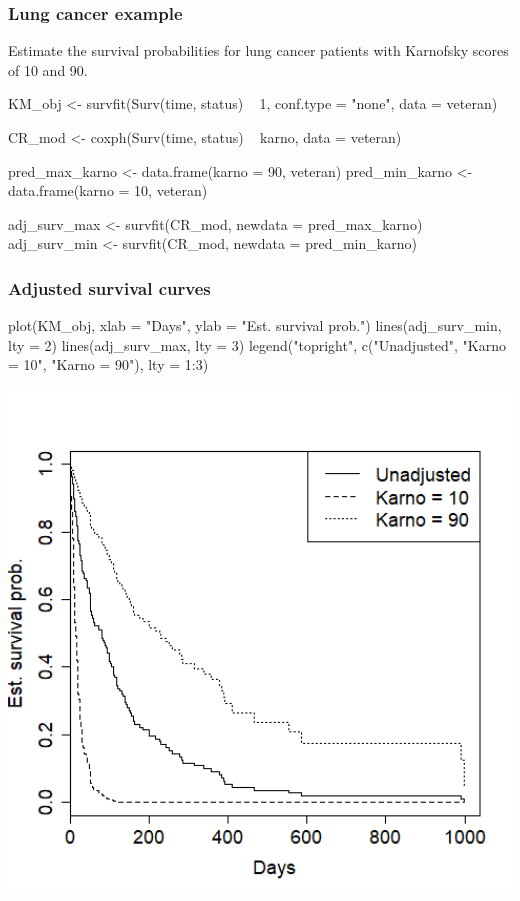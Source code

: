 \begin{frame}[fragile]
\frametitle{Lung cancer example}
Estimate the survival probabilities for lung cancer patients with Karnofsky scores of 10 and 90.
\begin{Rcode}{0.0}
KM_obj <- survfit(Surv(time, status) ~ 1,
                  conf.type = "none",
                  data = veteran)

CR_mod <- coxph(Surv(time, status) ~ karno, data = veteran)

pred_max_karno <- data.frame(karno = 90, veteran)
pred_min_karno <- data.frame(karno = 10, veteran)

adj_surv_max <- survfit(CR_mod, newdata = pred_max_karno)
adj_surv_min <- survfit(CR_mod, newdata = pred_min_karno)
\end{Rcode}
\end{frame}


\begin{frame}[fragile]
\frametitle{Adjusted survival curves}
\hspace*{-0.3in}
\begin{minipage}{0.58\textwidth}
\begin{Rcode}{0.0}
plot(KM_obj,
     xlab = "Days",
     ylab = "Est. survival prob.")
lines(adj_surv_min, lty = 2)
lines(adj_surv_max, lty = 3)
legend("topright",
       c("Unadjusted",
         "Karno = 10",
         "Karno = 90"),
       lty = 1:3)
\end{Rcode}
\end{minipage}
\begin{minipage}{0.42\textwidth}
\includegraphics[width=1.0\textwidth]{Figures/karno_adj.png}
\end{minipage}
\end{frame}



